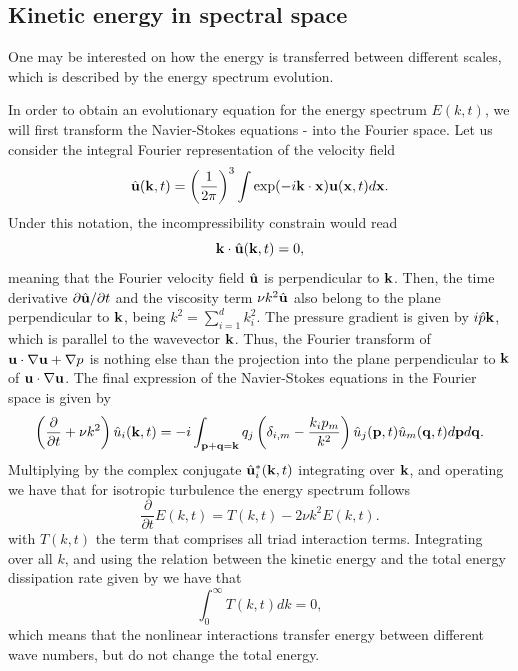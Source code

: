 \subsection{Kinetic energy in spectral space}
\label{subsec-isotropic_kinetic_energy_spectral}
One may be interested on how the energy is transferred between different scales, which is described by the energy spectrum evolution.

In order to obtain an evolutionary equation for the energy spectrum $E(k,t)$, we will first transform the Navier-Stokes equations - into the Fourier space. Let us consider the integral Fourier representation of the velocity field
$$\hat{{\bf u}}({\bf k},t)=\left(\frac{1}{2\pi}\right)^3\int\exp(-i{\bf k}\cdot{\bf x}){\bf u}({\bf x},t)d{\bf x}.$$
Under this notation, the incompressibility constrain  would read
$${\bf k}\cdot\hat{{\bf u}}({\bf k},t)=0,$$
meaning that the Fourier velocity field $\hat{{\bf u}}$ is perpendicular to ${\bf k}$. Then, the time derivative $\partial\hat{{\bf u}}/\partial t$ and the viscosity term $\nu k^2\hat{{\bf u}}$ also belong to the plane perpendicular to ${\bf k}$, being $k^2=\sum_{i=1}^dk_i^2$. The pressure gradient is given by $i\hat{p}{\bf k}$, which is parallel to the wavevector ${\bf k}$. Thus, the Fourier transform of ${\bf u}\cdot\nabla{\bf u}+\nabla p$ is nothing else than the projection into the plane perpendicular to ${\bf k}$ of ${\bf u}\cdot\nabla{\bf u}$. The final expression of the Navier-Stokes equations in the Fourier space is given by
\begin{equation}
\label{eq-NS_strong_fourier}
\left(\frac{\partial}{\partial t}+\nu k^2\right)\hat{u}_i({\bf k},t)=-i\int_{\mathbf{p}+\mathbf{q}={\bf k}}q_j\left(\delta_{i,m}-\frac{k_ip_m}{k^2}\right)\hat{u}_j(\mathbf{p},t)\hat{u}_m(\mathbf{q},t)d\mathbf{p}d\mathbf{q}.
\end{equation}
Multiplying  by the complex conjugate $\hat{{\bf u}}_i^*({\bf k},t)$ integrating over ${\bf k}$, and operating we have that for isotropic turbulence the energy spectrum follows
\begin{equation}
\label{eq-energy_fourier}
\frac{\partial}{\partial t}E(k,t)=T(k,t)-2\nu k^2E(k,t).
\end{equation}
with $T(k,t)$ the term that comprises all triad interaction terms. Integrating over all $k$, and using the relation between the kinetic energy and the total energy dissipation rate given by  we have that
$$\int_0^\infty T(k,t)dk=0,$$
which means that the nonlinear interactions transfer energy between different wave numbers, but do not change the total energy.

